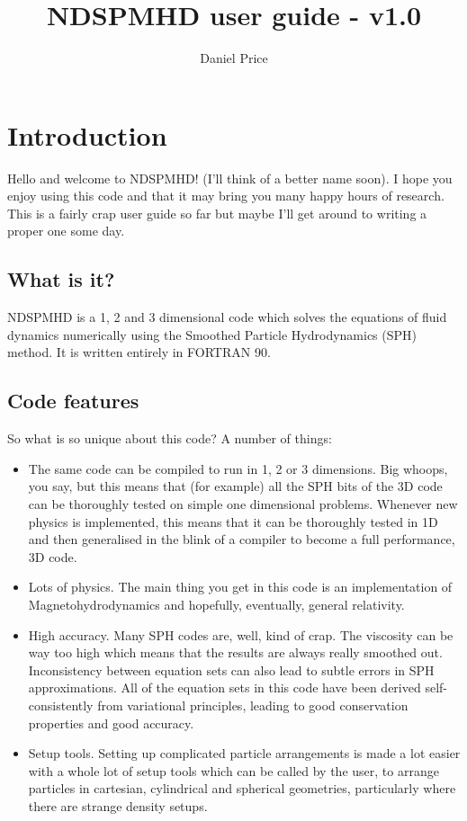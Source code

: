 \documentclass[a4paper,12pt]{article}
\title{NDSPMHD user guide - v1.0}
\author{Daniel Price}
\begin{document}
\maketitle
\tableofcontents

\section{Introduction}
 Hello and welcome to NDSPMHD! (I'll think of a better name soon). I hope you
enjoy using this code and that it may bring you many happy hours of research.
This is a fairly crap user guide so far but maybe I'll get around to writing a
proper one some day. 

\subsection{What is it?}
NDSPMHD is a 1, 2 and 3 dimensional code which solves the equations of fluid
dynamics numerically using the Smoothed Particle Hydrodynamics (SPH) method. It
is written entirely in FORTRAN 90.

\subsection{Code features}
 So what is so unique about this code? A number of things:
\begin{itemize}
\item The same code can be compiled to run in 1, 2 or 3 dimensions. Big whoops,
you say, but this means that (for example) all the SPH bits of the 3D code can be thoroughly tested
on simple one dimensional problems. Whenever new physics is implemented, this
means that it can be thoroughly tested in 1D and then generalised in the blink
of a compiler to become a full performance, 3D code.
\item Lots of physics. The main thing you get in this code is an implementation
of Magnetohydrodynamics and hopefully, eventually, general relativity.
\item High accuracy. Many SPH codes are, well, kind of crap. The viscosity can
be way too high which means that the results are always really smoothed out.
Inconsistency between equation sets can also lead to subtle errors in SPH
approximations. All of the equation sets in this code have been derived
self-consistently from variational principles, leading to good conservation
properties and good accuracy.
\item Setup tools. Setting up complicated particle arrangements is made a lot
easier with a whole lot of setup tools which can be called by the user, to
arrange particles in cartesian, cylindrical and spherical geometries,
particularly where there are strange density setups.
\end{itemize}
\end{document}
